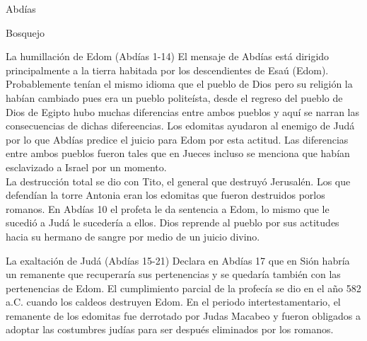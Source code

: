 \begin{section}{Abdías}
\begin{enumerate}
	\end{enumerate}
	\begin{subsection}{Bosquejo}
		\begin{subsubsection}{La humillación de Edom (Abdías 1-14)}
			El mensaje de Abdías está dirigido principalmente a la tierra habitada por los descendientes de Esaú (Edom). Probablemente tenían el mismo idioma que el pueblo de Dios pero su religión la habían cambiado pues era un pueblo politeísta, desde el regreso del pueblo de Dios de Egipto hubo muchas diferencias entre ambos pueblos y aquí se narran las consecuencias de dichas difereencias. Los edomitas ayudaron al enemigo de Judá por lo que Abdías predice el juicio para Edom por esta actitud. Las diferencias entre ambos pueblos fueron tales que en Jueces incluso se menciona que habían esclavizado a Israel por un momento.\\
			La destrucción total se dio con Tito, el general que destruyó Jerusalén.
			\newpage
			Los que defendían la torre Antonia eran los edomitas que fueron destruidos porlos romanos. En Abdías 10 el profeta le da sentencia a Edom, lo mismo que le sucedió a Judá le sucedería a ellos. Dios reprende al pueblo por sus actitudes hacia su hermano de sangre por medio de un juicio divino.
		\end{subsubsection}
		\begin{subsubsection}{La exaltación de Judá (Abdías 15-21)}
			Declara en Abdías 17 que en Sión habría un remanente que recuperaría sus pertenencias y se quedaría también con las pertenencias de Edom. El cumplimiento parcial de la profecía se dio en el año 582 a.C. cuando los caldeos destruyen Edom. En el periodo intertestamentario, el remanente de los edomitas fue derrotado por Judas Macabeo y fueron obligados a adoptar las costumbres judías para ser después eliminados por los romanos.
		\end{subsubsection}
	\end{subsection}
\end{section}
%


